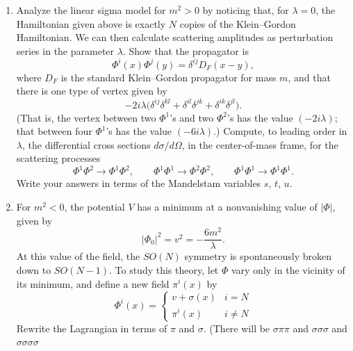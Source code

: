 \begin{enumerate}[label=(\alph*)]
  \item Analyze the linear sigma model for $m^2>0$ by noticing that, for
    $\lambda=0$, the Hamiltonian given above is exactly $N$ copies of the
    Klein--Gordon Hamiltonian.  We can then calculate scattering amplitudes
    as perturbation series in the parameter $\lambda$.  Show that the
    propagator is
    \begin{equation}
      \Phi^i(x)\Phi^j(y) = \delta^{ij}D_F(x-y) ,
    \end{equation}
    where $D_F$ is the standard Klein--Gordon propagator for mass $m$, and
    that there is one type of vertex given by
    \begin{equation}
      -2i\lambda\bigl( \delta^{ij}\delta^{kl} + \delta^{il}\delta^{jk}
        + \delta^{ik}\delta^{jl} \bigr) .
      \label{eq:4.vertex}
    \end{equation}
    (That is, the vertex between two $\Phi^1$'s and two $\Phi^2$'s has the
    value $(-2i\lambda)$; that between four $\Phi^1$'s has the value
    $(-6i\lambda)$.)  Compute, to leading order in $\lambda$, the
    differential cross sections $d\sigma/d\Omega$, in the center-of-mass
    frame, for the scattering processes
    \begin{equation}
      \Phi^1\Phi^2 \to \Phi^1\Phi^2,
      \qquad \Phi^1\Phi^1 \to \Phi^2\Phi^2,
      \qquad \Phi^1\Phi^1 \to \Phi^1\Phi^1 .
    \end{equation}
    Write your answers in terms of the Mandelstam variables $s$, $t$, $u$.
  \item For $m^2<0$, the potential $V$ has a minimum at a nonvanishing value
    of $|\Phi|$, given by
    \begin{equation}
      |\Phi_0|^2 = v^2 = -\frac{6m^2}{\lambda} .
    \end{equation}
    At this value of the field, the $SO(N)$ symmetry is spontaneously broken
    down to $SO(N-1)$.  To study this theory, let $\Phi$ vary only in the
    vicinity of its minimum, and define a new field $\pi^i(x)$ by
    \begin{equation}
      \Phi^i(x) = \begin{cases}
        v + \sigma(x) & i = N\\
        \pi^i(x) & i \neq N
      \end{cases}
    \end{equation}
    Rewrite the Lagrangian in terms of $\pi$ and $\sigma$.  (There will be
    $\sigma\pi\pi$ and $\sigma\sigma\sigma$ and $\sigma\sigma\sigma\sigma$

\end{enumerate}
